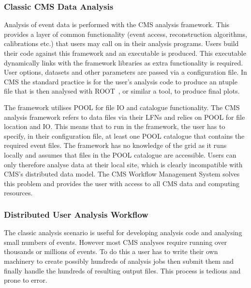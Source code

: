

\subsubsection{Classic CMS Data Analysis}
Analysis of event data is performed with the CMS analysis framework. This provides a layer of common functionality (event access, reconstruction algorithms, calibrations etc.) that users may call on in their analysis programs. Users build their code against this framework and an executable is produced. This executable dynamically links with the framework libraries as extra functionality is required. User options, datasets and other parameters are passed via a configuration file. In CMS the standard practice is for the user's analysis code to produce an ntuple file that is then analysed with ROOT~\cite{citeulike:363715}, or similar a tool, to produce final plots.

The framework utilises POOL for file IO and catalogue functionality. The CMS analysis framework refers to data files via their LFNs and relies on POOL for file location and IO. This means that to run in the framework, the user has to specify, in their configuration file, at least one POOL catalogue that contains the required event files. The framework has no knowledge of the grid as it runs locally and assumes that files in the POOL catalogue are accessible. Users can only therefore analyse data at their local site, which is clearly incompatible with CMS's distributed data model. The CMS Workflow Management System solves this problem and provides the user with access to all CMS data and computing resources.

\subsubsection{Distributed User Analysis Workflow}
The classic analysis scenario is useful for developing analysis code and analysing small numbers of events. However most CMS analyses require running over thousands or millions of events. To do this a user has to write their own machinery to create possibly hundreds of analysis jobs then submit them and finally handle the hundreds of resulting output files. This process is tedious and prone to error.

